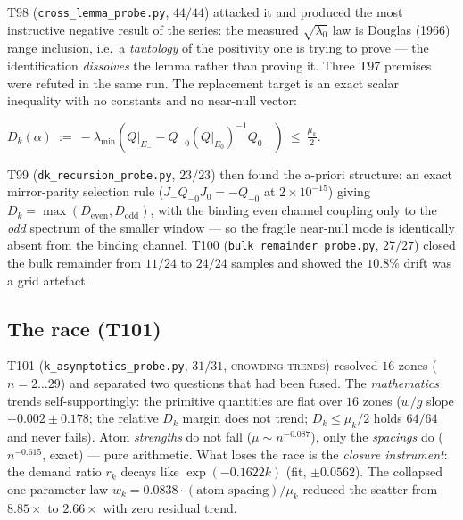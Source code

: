 \documentclass[11pt,a4paper]{article}
\begin{document}
T98 (\texttt{cross\_lemma\_probe.py}, $44/44$) attacked it and produced the most instructive negative
result of the series: the measured $\sqrt{\lambda_0}$ law is Douglas (1966) range inclusion, i.e.\ a
\emph{tautology} of the positivity one is trying to prove --- the identification \emph{dissolves} the
lemma rather than proving it. Three T97 premises were refuted in the same run. The replacement target
is an exact scalar inequality with no constants and no near-null vector:

\begin{keyeq}$\displaystyle
D_k(\alpha)\ :=\ -\lambda_{\min}\!\left(Q|_{E_-}-Q_{-0}(Q|_{E_0})^{-1}Q_{0-}\right)\ \le\ \tfrac{\mu_k}{2}.$\end{keyeq}

\noindent T99 (\texttt{dk\_recursion\_probe.py}, $23/23$) then found the a-priori structure: an exact
mirror-parity selection rule ($J_-Q_{-0}J_0=-Q_{-0}$ at $2\times10^{-15}$) giving
$D_k=\max(D_{\mathrm{even}},D_{\mathrm{odd}})$, with the binding even channel coupling only to the
\emph{odd} spectrum of the smaller window --- so the fragile near-null mode is identically absent from
the binding channel. T100 (\texttt{bulk\_remainder\_probe.py}, $27/27$) closed the bulk remainder from
$11/24$ to $24/24$ samples and showed the $10.8\%$ drift was a grid artefact.

\subsection{The race (T101)}
T101 (\texttt{k\_asymptotics\_probe.py}, $31/31$, \textsc{crowding-trends}) resolved $16$ zones
($n=2\ldots29$) and separated two questions that had been fused. The \emph{mathematics} trends
self-supportingly: the primitive quantities are flat over $16$ zones ($w/g$ slope $+0.002\pm0.178$;
the relative $D_k$ margin does not trend; $D_k\le\mu_k/2$ holds $64/64$ and never fails). Atom
\emph{strengths} do not fall ($\mu\sim n^{-0.087}$), only the \emph{spacings} do ($n^{-0.615}$, exact) ---
pure arithmetic. What loses the race is the \emph{closure instrument}: the demand ratio $r_k$ decays
like $\exp(-0.1622k)$ (fit, $\pm0.0562$). The collapsed one-parameter law
$w_k=0.0838\cdot(\text{atom spacing})/\mu_k$ reduced the scatter from $8.85\times$ to $2.66\times$ with
zero residual trend.
\end{document}
